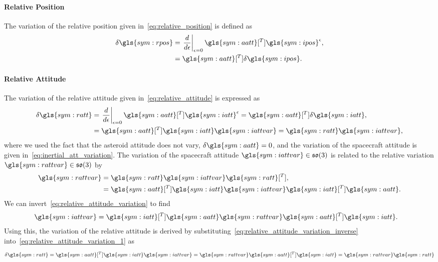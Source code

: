 \paragraph{Relative Position}\label{sec:relative_position_variation}
The variation of the relative position given in~\cref{eq:relative_position} is defined as
\begin{align*}
    \delta \gls{sym:rpos} &= \left. \diff{}{\epsilon} \right|_{\epsilon=0} \gls{sym:aatt}[^T] \gls{sym:ipos}^\epsilon ,\nonumber \\
                        &= \gls{sym:aatt}[^T] \delta \gls{sym:ipos}.
\end{align*}

\paragraph{Relative Attitude}\label{sec:relative_attitude_variation}
The variation of the relative attitude given in~\cref{eq:relative_attitude} is expressed as
\begin{align}
    \delta \gls{sym:ratt} &= \left. \diff{}{\epsilon} \right|_{\epsilon=0}  \gls{sym:aatt}[^T] \gls{sym:iatt}^\epsilon = \gls{sym:aatt}[^T] \delta \gls{sym:iatt}, \nonumber\\
                          &= \gls{sym:aatt}[^T] \gls{sym:iatt} \gls{sym:iattvar} = \gls{sym:ratt} \gls{sym:iattvar}, \label{eq:relative_attitude_variation_1}
\end{align}
where we used the fact that the asteroid attitude does not vary, \( \delta \gls{sym:aatt} = 0\), and the variation of the spacecraft attitude is given in~\cref{eq:inertial_att_variation}.
The variation of the spacecraft attitude \( \gls{sym:iattvar} \in \so \) is related to the relative variation \( \gls{sym:rattvar} \in \so \) by
\begin{align}
    \gls{sym:rattvar} &= \gls{sym:ratt} \gls{sym:iattvar} \gls{sym:ratt}[^T],\nonumber\\
                      &= \gls{sym:aatt}[^T] \gls{sym:iatt} \gls{sym:iattvar} \gls{sym:iatt}[^T] \gls{sym:aatt}.
\end{align}
We can invert~\cref{eq:relative_attitude_variation} to find
\begin{align}\label{eq:relative_attitude_variation_inverse}
    \gls{sym:iattvar} &= \gls{sym:iatt}[^T] \gls{sym:aatt} \gls{sym:rattvar} \gls{sym:aatt}[^T] \gls{sym:iatt}.
\end{align}
Using this, the variation of the relative attitude is derived by substituting~\cref{eq:relative_attitude_variation_inverse} into~\cref{eq:relative_attitude_variation_1} as
\begin{align}\label{eq:relative_attitude_matrix_variation}
    \delta \gls{sym:ratt} = \gls{sym:aatt}[^T] \gls{sym:iatt} \gls{sym:iattvar} = \gls{sym:rattvar} \gls{sym:aatt}[^T] \gls{sym:iatt} = \gls{sym:rattvar} \gls{sym:ratt}
\end{align}

